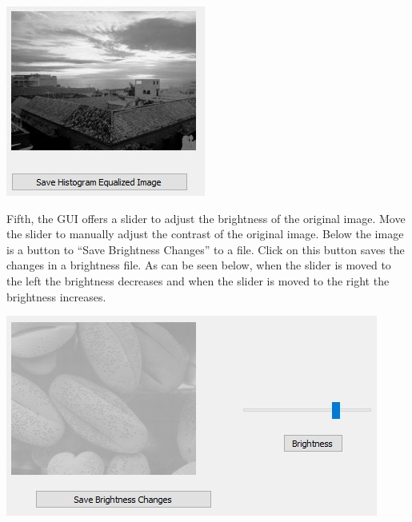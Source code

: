\documentclass{article}
\newenvironment{Figure}
  {\par\medskip\noindent\ignorespaces\minipage{\linewidth}}
  {\endminipage\par\medskip}
\begin{document}
\begin{multicols*}{2}
\begin{Figure}
 \centering
 \includegraphics[width=\linewidth]{HistogramEqualizedImage2.jpg}
\end{Figure}

Fifth, the GUI offers a slider to adjust the brightness of the original image. Move the slider to manually adjust the contrast of the original image. Below the image is a button to “Save Brightness Changes” to a file. Click on this button saves the changes in a brightness file. As can be seen below, when the slider is moved to the left the brightness decreases and when the slider is moved to the right the brightness increases.


\begin{Figure}
 \centering
 \includegraphics[width=\linewidth]{BrightnessImage.jpg}
\end{Figure}


\end{multicols*}
\end{document}
